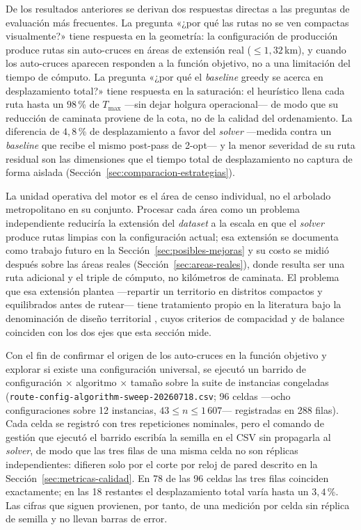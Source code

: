 De los resultados anteriores se derivan dos respuestas directas a las preguntas de
evaluación más frecuentes. La pregunta «¿por qué las rutas no se ven compactas
visualmente?» tiene respuesta en la geometría: la configuración de producción produce
rutas sin auto-cruces en áreas de extensión real ($\leq 1{,}32$\,km), y cuando los auto-cruces
aparecen responden a la función objetivo, no a una limitación del tiempo de cómputo.
La pregunta «¿por qué el \textit{baseline} greedy se acerca en desplazamiento total?»
tiene respuesta en la saturación: el heurístico llena cada ruta hasta un $98$\,\%
de $T_{\max}$ ---sin dejar holgura operacional--- de modo que su reducción de caminata
proviene de la cota, no de la calidad del ordenamiento. La diferencia de $4{,}8$\,\%
de desplazamiento a favor del \textit{solver} ---medida contra un \textit{baseline}
que recibe el mismo post-pass de 2-opt--- y la menor severidad de su ruta residual son
las dimensiones que el tiempo total de
desplazamiento no captura de forma aislada (Sección~\ref{sec:comparacion-estrategias}).

La unidad operativa del motor es el área de censo individual, no el arbolado
metropolitano en su conjunto. Procesar cada área como un problema independiente
reduciría la extensión del \textit{dataset} a la escala en que el \textit{solver}
produce rutas limpias con la configuración actual; esa extensión se documenta como
trabajo futuro en la Sección~\ref{sec:posibles-mejoras} y su costo se midió
después sobre las áreas reales (Sección~\ref{sec:areas-reales}), donde resulta ser
una ruta adicional y el triple de cómputo, no kilómetros de caminata. El problema que esa extensión
plantea ---repartir un territorio en distritos compactos y equilibrados antes de
rutear--- tiene tratamiento propio en la literatura bajo la denominación de diseño
territorial \citep{kalcsics2005towards,rios2009reactive}, cuyos criterios de
compacidad y de balance coinciden con los dos ejes que esta sección mide.

Con el fin de confirmar el origen de los auto-cruces en la función objetivo y explorar si existe
una configuración universal, se ejecutó un barrido de configuración $\times$ algoritmo
$\times$ tamaño sobre la suite de instancias congeladas
(\texttt{route-config-algorithm-sweep-20260718.csv}; 96 celdas ---ocho
configuraciones sobre 12 instancias, $43 \leq n \leq 1\,607$--- registradas en
288 filas). Cada celda se registró con tres repeticiones nominales, pero el
comando de gestión que ejecutó el barrido escribía la semilla en el CSV sin
propagarla al \textit{solver}, de modo que las tres filas de una misma celda no
son réplicas independientes: difieren solo por el corte por reloj de pared
descrito en la Sección~\ref{sec:metricas-calidad}. En 78 de las 96 celdas las
tres filas coinciden exactamente; en las 18 restantes el desplazamiento total
varía hasta un $3{,}4$\,\%. Las cifras que siguen provienen, por tanto, de una
medición por celda sin réplica de semilla y no llevan barras de error.

